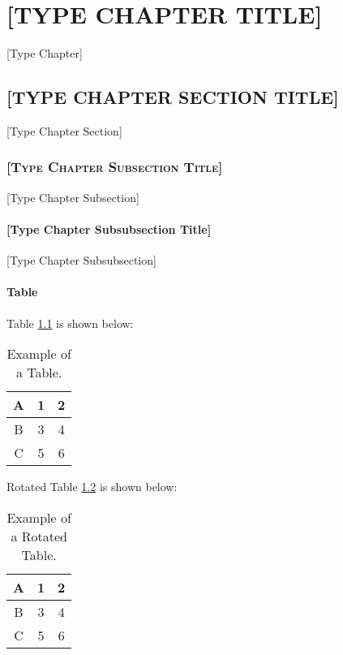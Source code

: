 \chapter{\uppercase{[Type Chapter Title]}}
[Type Chapter]
\section{\uppercase{[Type Chapter Section Title]}}
[Type Chapter Section]
\subsection{\textsc{[Type Chapter Subsection Title]}}
[Type Chapter Subsection]
\subsubsection{[Type Chapter Subsubsection Title]}
[Type Chapter Subsubsection]
\subsubsection{Table}
Table \ref{table:4:1} is shown below:

\begin{table}[!htb]
	\caption{Example of a Table.}
	\label{table:4:1}
	\centering
	\begin{tabular}{|c|c|c|}
		\hline
		A & 1 & 2 \\ \hline
		B & 3 & 4 \\ \hline
		C & 5 & 6 \\ \hline
	\end{tabular}
\end{table}

Rotated Table \ref{table:4:2} is shown below:
\begin{landscape}
\begin{table}[!htb]
	\caption{Example of a Rotated Table.}
	\label{table:4:2}
	\centering
	\begin{tabular}{|c|c|c|}
		\hline
		A & 1 & 2 \\ \hline
		B & 3 & 4 \\ \hline
		C & 5 & 6 \\ \hline
	\end{tabular}
\end{table}
\end{landscape}